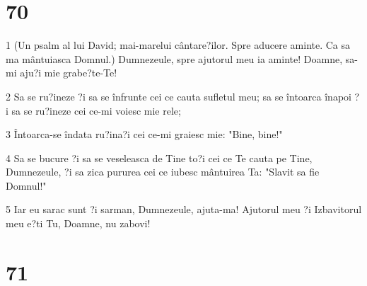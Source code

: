 \chapter{70}

\par 1 (Un psalm al lui David; mai-marelui cântare?ilor. Spre aducere aminte. Ca sa ma mântuiasca Domnul.) Dumnezeule, spre ajutorul meu ia aminte! Doamne, sa-mi aju?i mie grabe?te-Te!
\par 2 Sa se ru?ineze ?i sa se înfrunte cei ce cauta sufletul meu; sa se întoarca înapoi ?i sa se ru?ineze cei ce-mi voiesc mie rele;
\par 3 Întoarca-se îndata ru?ina?i cei ce-mi graiesc mie: "Bine, bine!"
\par 4 Sa se bucure ?i sa se veseleasca de Tine to?i cei ce Te cauta pe Tine, Dumnezeule, ?i sa zica pururea cei ce iubesc mântuirea Ta: "Slavit sa fie Domnul!"
\par 5 Iar eu sarac sunt ?i sarman, Dumnezeule, ajuta-ma! Ajutorul meu ?i Izbavitorul meu e?ti Tu, Doamne, nu zabovi!

\chapter{71}

